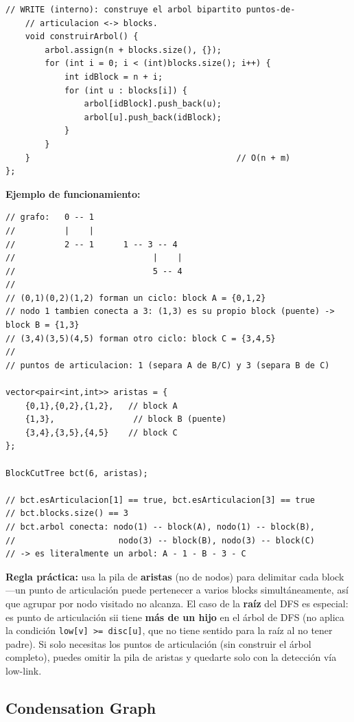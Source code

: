 \documentclass[10pt,a4paper,twocolumn]{article}
\begin{document}
\begin{lstlisting}[style=cpp]
    // WRITE (interno): construye el arbol bipartito puntos-de-
    // articulacion <-> blocks.
    void construirArbol() {
        arbol.assign(n + blocks.size(), {});
        for (int i = 0; i < (int)blocks.size(); i++) {
            int idBlock = n + i;
            for (int u : blocks[i]) {
                arbol[idBlock].push_back(u);
                arbol[u].push_back(idBlock);
            }
        }
    }                                          // O(n + m)
};
\end{lstlisting}

\textbf{Ejemplo de funcionamiento:}

\begin{lstlisting}[style=cpp]
// grafo:   0 -- 1
//          |    |
//          2 -- 1      1 -- 3 -- 4
//                            |    |
//                            5 -- 4
//
// (0,1)(0,2)(1,2) forman un ciclo: block A = {0,1,2}
// nodo 1 tambien conecta a 3: (1,3) es su propio block (puente) -> block B = {1,3}
// (3,4)(3,5)(4,5) forman otro ciclo: block C = {3,4,5}
//
// puntos de articulacion: 1 (separa A de B/C) y 3 (separa B de C)

vector<pair<int,int>> aristas = {
    {0,1},{0,2},{1,2},   // block A
    {1,3},                // block B (puente)
    {3,4},{3,5},{4,5}    // block C
};

BlockCutTree bct(6, aristas);

// bct.esArticulacion[1] == true, bct.esArticulacion[3] == true
// bct.blocks.size() == 3
// bct.arbol conecta: nodo(1) -- block(A), nodo(1) -- block(B),
//                     nodo(3) -- block(B), nodo(3) -- block(C)
// -> es literalmente un arbol: A - 1 - B - 3 - C
\end{lstlisting}

\textbf{Regla práctica:} usa la pila de \textbf{aristas} (no de
nodos) para delimitar cada block —un punto de articulación puede
pertenecer a varios blocks simultáneamente, así que agrupar por nodo
visitado no alcanza. El caso de la \textbf{raíz} del DFS es especial:
es punto de articulación sii tiene \textbf{más de un hijo} en el
árbol de DFS (no aplica la condición \texttt{low[v] >= disc[u]}, que
no tiene sentido para la raíz al no tener padre). Si solo necesitas
los puntos de articulación (sin construir el árbol completo), puedes
omitir la pila de aristas y quedarte solo con la detección vía
low-link.

\subsection{Condensation Graph}
\end{document}
